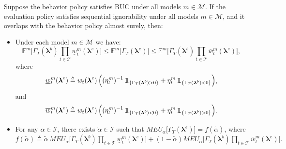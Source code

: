 \documentclass[opre,nonblindrev]{informs2}%
\newcommand{\teq}{\triangleq}
\newcommand{\1}{\hbox{\rm 1\kern-.35em 1}}
\newcommand{\E}{\mathbb E}
\newcommand{\MT}{\mathscr T}
\newcommand{\MI}{\mathscr I}
\newcommand{\MM}{\mathscr M}
\newcommand{\blambda}{\boldsymbol{\lambda}}
\newcommand{\un}{\underline}
\newcommand{\ov}{\overline}
\begin{document}
\begin{proposition}\label{prop:buc}
Suppose the behavior policy  satisfies BUC under all models $m\in\MM$. If the evaluation policy  satisfies sequential ignorability under all models $m\in\MM$, and it overlaps with the behavior policy almost surely, then:
\begin{itemize}[leftmargin=1cm,align=left]
\item[(i)] Under each model $m\in\MM$ we have:
$$\E^m\big[\Gamma_T(\blambda^b) \prod_{t\in\MT} \un w^m_t(\blambda^e)\big] \leq \E^m\big[\Gamma_T(\blambda^e)\big]\leq \E^m\big[\Gamma_T(\blambda^b) \prod_{t\in\MT} \ov w^m_t(\blambda^e)\big],$$
where
$$\un w^m_t(\blambda^e)\teq w_t(\blambda^e)\, \Big(({\eta^m_t})^{-1}\, \1_{\{\Gamma_T(\blambda^b) >0\}}+ {\eta^m_t}\, \1_{\{\Gamma_T(\blambda^b) <0\}}\Big),$$
and
$$\ov w^m_t(\blambda^e)\teq w_t(\blambda^e)\, \Big(({\eta^m_t})^{-1}\, \1_{\{\Gamma_T(\blambda^b) <0\}}+ {\eta^m_t}\, \1_{\{\Gamma_T(\blambda^b)>0\}}\Big).$$
\item[(ii)] For any $\alpha\in\MI$, there exists $\tilde\alpha\in\MI$ such that
$MEU_\alpha\big[\Gamma_T(\blambda^e)\big]= f(\tilde\alpha)$,
where $f (\tilde\alpha)\teq \tilde\alpha\, MEU_\alpha\big[\Gamma_T(\blambda^b) \prod_{t\in\MT} \un w^m_t(\blambda^e)\big]+ (1-\tilde\alpha) MEU_\alpha\big[\Gamma_T(\blambda^b) \prod_{t\in\MT} \ov w^m_t(\blambda^e)\big].$
\end{itemize}
\end{proposition}
\end{document}

